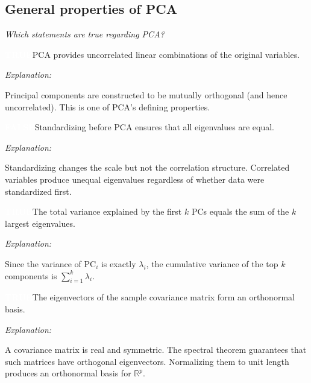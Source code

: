 \documentclass[12pt, a4paper]{article}
\newcommand{\truelabel}{\textcolor{white}{\colorbox{truegreen}{\textbf{TRUE}}}}
\newcommand{\falselabel}{\textcolor{white}{\colorbox{falsered}{\textbf{FALSE}}}}
\newenvironment{statement}[1]{%
  \par\medskip
  \noindent #1\par\smallskip
  \noindent
}{\par}
\newenvironment{explanation}{%
  \noindent\small\color{headergray}\textit{Explanation: }%
}{\par}
\begin{document}
\subsection{General properties of PCA}

\textit{Which statements are true regarding PCA?}

\bigskip

\begin{statement}{\truelabel\quad PCA provides uncorrelated linear combinations of the original variables.}
\begin{explanation}
Principal components are constructed to be mutually orthogonal (and hence uncorrelated). This is one of PCA's defining properties.
\end{explanation}
\end{statement}

\begin{statement}{\falselabel\quad Standardizing before PCA ensures that all eigenvalues are equal.}
\begin{explanation}
Standardizing changes the scale but not the correlation structure. Correlated variables produce unequal eigenvalues regardless of whether data were standardized first.
\end{explanation}
\end{statement}

\begin{statement}{\truelabel\quad The total variance explained by the first $k$ PCs equals the sum of the $k$ largest eigenvalues.}
\begin{explanation}
Since the variance of PC$_i$ is exactly $\lambda_i$, the cumulative variance of the top $k$ components is $\sum_{i=1}^{k} \lambda_i$.
\end{explanation}
\end{statement}

\begin{statement}{\truelabel\quad The eigenvectors of the sample covariance matrix form an orthonormal basis.}
\begin{explanation}
A covariance matrix is real and symmetric. The spectral theorem guarantees that such matrices have orthogonal eigenvectors. Normalizing them to unit length produces an orthonormal basis for $\mathbb{R}^p$.
\end{explanation}
\end{statement}

\end{document}
